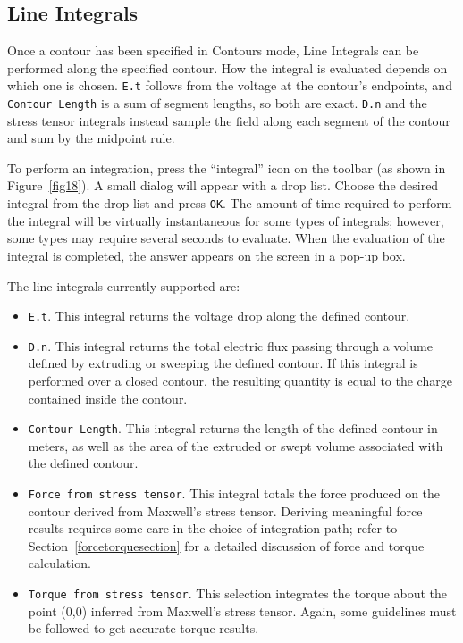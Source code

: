 \documentclass[12pt]{report}
\begin{document}
\subsection{Line Integrals}

Once a contour has been specified in Contours mode, Line Integrals can be
performed along the specified contour.  How the integral is evaluated
depends on which one is chosen.  {\tt E.t} follows from the voltage at the
contour's endpoints, and {\tt Contour Length} is a sum of segment lengths,
so both are exact.  {\tt D.n} and the stress tensor integrals instead sample
the field along each segment of the contour and sum by the midpoint rule.

To perform an integration, press the ``integral'' icon on the
toolbar (as shown in Figure~\ref{fig18}). A small dialog will appear with a
drop list. Choose the desired integral from the drop list and press
\texttt{OK}. The amount of time required to perform the integral
will be virtually instantaneous for some types of integrals;
however, some types may require several seconds to evaluate. When
the evaluation of the integral is completed, the answer appears on
the screen in a pop-up box.

The line integrals currently supported are:


\begin{itemize}


\item \texttt{E.t}. This integral returns the voltage drop along the defined
contour.

\item \texttt{D.n}. This integral returns the total electric flux passing through
a volume defined by extruding or sweeping the defined contour. If this
integral is performed over a closed contour, the resulting quantity is equal
to the charge contained inside the contour.

\item \texttt{Contour Length}. This integral returns the length of the
defined contour in meters, as well as the area of the extruded or swept
volume associated with the defined contour.

\item \texttt{Force from stress tensor}. This integral totals the force produced
on the contour derived from Maxwell's stress tensor. Deriving
meaningful force results requires some care in the choice of
integration path; refer to Section~\ref{forcetorquesection} for a
detailed discussion of force and torque calculation.

\item \texttt{Torque from stress tensor}. This selection integrates the torque
about the point (0,0) inferred from Maxwell's stress tensor. Again,
some guidelines must be followed to get accurate torque results.

\end{itemize}
\end{document}
